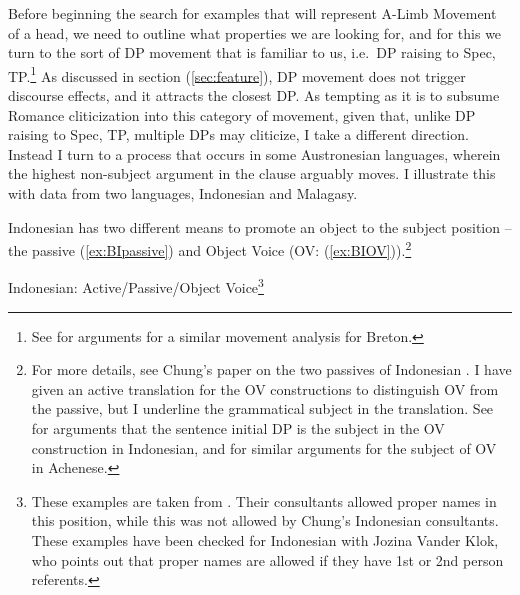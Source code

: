 \documentclass[output=paper,colorlinks,citecolor=brown,
]{langscibook}
\begin{document}
Before beginning the search for examples that will represent A-Limb Movement of a head, we need to outline what properties we are looking for, and for this we turn to the sort of DP movement that is familiar to us, i.e.\ DP raising to Spec, TP.\footnote{See \citet{Baker:1990} for arguments for a similar movement analysis for Breton.}  As discussed in section (\ref{sec:feature}), DP movement does not trigger discourse effects, and it attracts the closest DP.  As tempting as it is to subsume Romance cliticization into this category of movement, given that, unlike DP raising to Spec, TP, multiple DPs may cliticize, I take a different direction. Instead I turn to a process that occurs in some Austronesian languages, wherein  the highest non-subject argument in the clause arguably moves.  I illustrate this with data from two languages, Indonesian and Malagasy.

Indonesian has two different means to promote an object to the subject position -- the passive (\ref{ex:BIpassive}) and Object Voice (OV: (\ref{ex:BIOV})).\footnote{For more details, see Chung's paper on the two passives of Indonesian \citep{Chung:1976a}. I have given an active translation for the OV constructions to distinguish OV from the passive, but I underline the grammatical subject in the translation.  See \citet{Chung:1976a} for arguments that the sentence initial DP is the subject in the OV construction in Indonesian, and \citet{Legate:2014} for similar arguments for the subject of OV in Achenese.}

\ea Indonesian: Active/Passive/Object Voice\footnote{These examples are taken from \citet{Guilfoyle:1992}.  Their consultants allowed proper names in this position, while this was not allowed by Chung's Indonesian consultants.  These examples have been checked for Indonesian with Jozina Vander Klok, who points out that proper names are allowed if they have 1st or 2nd person referents.}
    \z
\z
\end{document}
